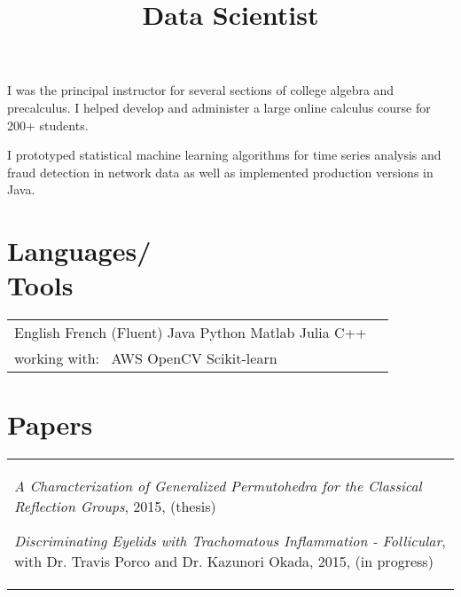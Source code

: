 \documentclass[margin,line,pifont,palatino,courier]{res}
\newenvironment{list1}{
  \begin{list}{\label{ } }{
      \setlength{\itemsep}{0in}
      \setlength{\parsep}{0in} \setlength{\parskip}{0in}
      \setlength{\topsep}{0in} \setlength{\partopsep}{0in}
      \setlength{\leftmargin}{0.0in} } }{\end{list} }
\begin{document}
\begin{resume}
    \begin{position}
    I was the principal instructor for several sections of college algebra and precalculus.  I helped develop and administer a large online calculus course for 200+ students.
    \end{position}
  
    \title{ Data Scientist  }

    \begin{position}
    I prototyped statistical machine learning algorithms for time series analysis and fraud detection in network data as well as implemented production versions in Java.
    \end{position}
  

\section{\sc Languages/ \\ Tools}

  \begin{tabular}{@{}p{6in}p{3in}}

     English  French (Fluent)  Java  Python  Matlab  Julia  C++ 
    \\working with: \ 
     AWS  OpenCV  Scikit-learn 

  \end{tabular}


\section{\sc Papers}
  \begin{tabular}{@{}p{5in}}
    \begin{list1}
      
      
        
            \item {\em A Characterization of Generalized Permutohedra for the Classical Reflection Groups},  2015, (thesis)  
        
      \vspace{.2em}
      
        
      \vspace{.2em}
      
        
      \vspace{.2em}
      
        
            \item {\em Discriminating Eyelids with Trachomatous Inflammation - Follicular},  with Dr. Travis Porco and Dr. Kazunori Okada,  2015, (in progress)  
        

\end{list1}
\end{tabular}
\end{resume}
\end{document}
